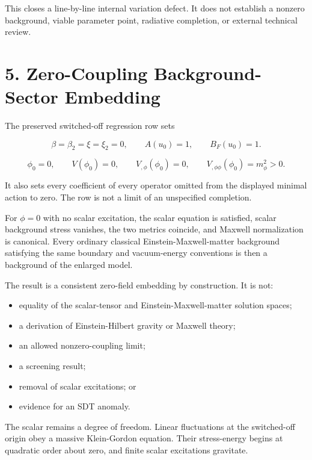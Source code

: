 \documentclass[
  american,
  11pt,
  letterpaper,
]{article}
\providecommand{\tightlist}{%
  \setlength{\itemsep}{0pt}\setlength{\parskip}{0pt}}
\begin{document}
This closes a line-by-line internal variation defect. It does not establish a nonzero background, viable parameter point, radiative completion, or external technical review.

\section{5. Zero-Coupling Background-Sector Embedding}\label{zero-coupling-background-sector-embedding}

The preserved switched-off regression row sets

\begin{equation}
\beta=\beta_2=\xi=\xi_2=0,\qquad A(u_0)=1,\qquad B_F(u_0)=1.
\tag{21}
\end{equation}

\begin{equation}
\phi_0=0,\qquad V(\phi_0)=0,\qquad V_{,\phi}(\phi_0)=0,\qquad
V_{,\phi\phi}(\phi_0)=m_\phi^2>0.
\tag{22}
\end{equation}

It also sets every coefficient of every operator omitted from the displayed minimal action to zero. The row is not a limit of an unspecified completion.

For \(\phi=0\) with no scalar excitation, the scalar equation is satisfied, scalar background stress vanishes, the two metrics coincide, and Maxwell normalization is canonical. Every ordinary classical Einstein-Maxwell-matter background satisfying the same boundary and vacuum-energy conventions is then a background of the enlarged model.

The result is a consistent zero-field embedding by construction. It is not:

\begin{itemize}
\tightlist
\item
  equality of the scalar-tensor and Einstein-Maxwell-matter solution spaces;
\item
  a derivation of Einstein-Hilbert gravity or Maxwell theory;
\item
  an allowed nonzero-coupling limit;
\item
  a screening result;
\item
  removal of scalar excitations; or
\item
  evidence for an SDT anomaly.
\end{itemize}

The scalar remains a degree of freedom. Linear fluctuations at the switched-off origin obey a massive Klein-Gordon equation. Their stress-energy begins at quadratic order about zero, and finite scalar excitations gravitate.
\end{document}
